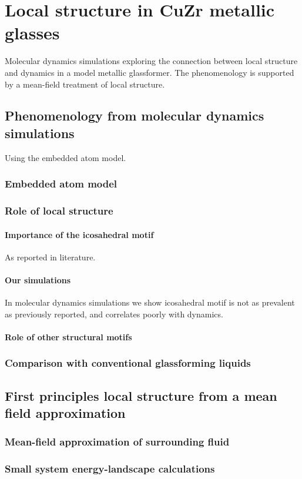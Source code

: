 \documentclass[12pt]{report}
\begin{document}
\chapter{Local structure in CuZr metallic glasses}
Molecular dynamics simulations exploring the connection between local structure and dynamics in a model metallic glassformer.
The phenomenology is supported by a mean-field treatment of local structure.

\section{Phenomenology from molecular dynamics simulations}
Using the embedded atom model.
\subsection{Embedded atom model}
\subsection{Role of local structure}
\subsubsection{Importance of the icosahedral motif}
As reported in literature.
\subsubsection{Our simulations}
In molecular dynamics simulations we show icosahedral motif is not as prevalent as previously reported, and correlates poorly with dynamics.
\subsubsection{Role of other structural motifs}
\subsection{Comparison with conventional glassforming liquids}

\section{First principles local structure from a mean field approximation}
\subsection{Mean-field approximation of surrounding fluid}
\subsection{Small system energy-landscape calculations}
\end{document}

